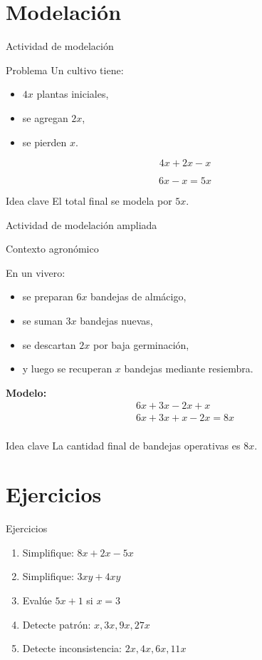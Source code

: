 \documentclass[aspectratio=169,12pt]{beamer}
\newcommand{\IdeaClave}[1]{
	\begin{alertblock}{Idea clave}
		#1
	\end{alertblock}
}
\newcommand{\Agronomia}[1]{
	\begin{exampleblock}{Contexto agronómico}
		#1
	\end{exampleblock}
}
\begin{document}
	\section{Modelación}
	\begin{frame}{Actividad de modelación}
		\begin{block}{Problema}
			Un cultivo tiene:
			\begin{itemize}
				\item \(4x\) plantas iniciales,
				\pause
				\item se agregan \(2x\),
				\pause
				\item se pierden \(x\).
			\end{itemize}
		\end{block}
		
		\pause
		\[
		4x+2x-x
		\]
		
		\pause
		\[
		6x-x=5x
		\]
		
		\pause
		\IdeaClave{El total final se modela por \(5x\).}
	\end{frame}
	
	\begin{frame}{Actividad de modelación ampliada}
		\Agronomia{
			En un vivero:
			\begin{itemize}
				\item se preparan \(6x\) bandejas de almácigo,
				\pause
				\item se suman \(3x\) bandejas nuevas,
				\pause
				\item se descartan \(2x\) por baja germinación,
				\pause
				\item y luego se recuperan \(x\) bandejas mediante resiembra.
			\end{itemize}
		}
		
		\pause
		\textbf{Modelo:}
		\[
		\begin{array}{c}
		6x+3x-2x+x \\
		6x+3x+x-2x = 8x \\
		\end{array}
		\]
		\pause
		\IdeaClave{La cantidad final de bandejas operativas es \(8x\).}
	\end{frame}
	
	\section{Ejercicios}
	\begin{frame}{Ejercicios}
		\begin{enumerate}[<+->]
			\item Simplifique: \(8x+2x-5x\)
			\item Simplifique: \(3xy+4xy\)
			\item Evalúe \(5x+1\) si \(x=3\)
			\item Detecte patrón: \(x,3x,9x,27x\)
			\item Detecte inconsistencia: \(2x,4x,6x,11x\)
		\end{enumerate}
	\end{frame}
	
\end{document}
